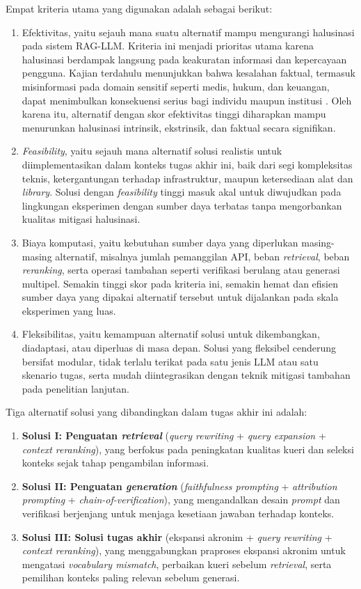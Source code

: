 Empat kriteria utama yang digunakan adalah sebagai berikut:
\begin{enumerate}[1.]
  \item Efektivitas, yaitu sejauh mana suatu alternatif mampu mengurangi halusinasi pada sistem RAG-LLM. Kriteria ini menjadi prioritas utama karena halusinasi berdampak langsung pada keakuratan informasi dan kepercayaan pengguna. Kajian terdahulu menunjukkan bahwa kesalahan faktual, termasuk misinformasi pada domain sensitif seperti medis, hukum, dan keuangan, dapat menimbulkan konsekuensi serius bagi individu maupun institusi \parencite{pang2024medical}. Oleh karena itu, alternatif dengan skor efektivitas tinggi diharapkan mampu menurunkan halusinasi intrinsik, ekstrinsik, dan faktual secara signifikan.
  \item \textit{Feasibility}, yaitu sejauh mana alternatif solusi realistis untuk diimplementasikan dalam konteks tugas akhir ini, baik dari segi kompleksitas teknis, ketergantungan terhadap infrastruktur, maupun ketersediaan alat dan \textit{library}. Solusi dengan \textit{feasibility} tinggi masuk akal untuk diwujudkan pada lingkungan eksperimen dengan sumber daya terbatas tanpa mengorbankan kualitas mitigasi halusinasi.
  \item Biaya komputasi, yaitu kebutuhan sumber daya yang diperlukan masing-masing alternatif, misalnya jumlah pemanggilan API, beban \textit{retrieval}, beban \textit{reranking}, serta operasi tambahan seperti verifikasi berulang atau generasi multipel. Semakin tinggi skor pada kriteria ini, semakin hemat dan efisien sumber daya yang dipakai alternatif tersebut untuk dijalankan pada skala eksperimen yang luas.
  \item Fleksibilitas, yaitu kemampuan alternatif solusi untuk dikembangkan, diadaptasi, atau diperluas di masa depan. Solusi yang fleksibel cenderung bersifat modular, tidak terlalu terikat pada satu jenis LLM atau satu skenario tugas, serta mudah diintegrasikan dengan teknik mitigasi tambahan pada penelitian lanjutan.
\end{enumerate}

Tiga alternatif solusi yang dibandingkan dalam tugas akhir ini adalah:
\begin{enumerate}[1.]
  \item \textbf{Solusi I: Penguatan \textit{retrieval}} (\textit{query rewriting} + \textit{query expansion} + \textit{context reranking}), yang berfokus pada peningkatan kualitas kueri dan seleksi konteks sejak tahap pengambilan informasi.
  \item \textbf{Solusi II: Penguatan \textit{generation}} (\textit{faithfulness prompting} + \textit{attribution prompting} + \textit{chain-of-verification}), yang mengandalkan desain \textit{prompt} dan verifikasi berjenjang untuk menjaga kesetiaan jawaban terhadap konteks.
  \item \textbf{Solusi III: Solusi tugas akhir} (ekspansi akronim + \textit{query rewriting} + \textit{context reranking}), yang menggabungkan praproses ekspansi akronim untuk mengatasi \textit{vocabulary mismatch}, perbaikan kueri sebelum \textit{retrieval}, serta pemilihan konteks paling relevan sebelum generasi.
\end{enumerate}

